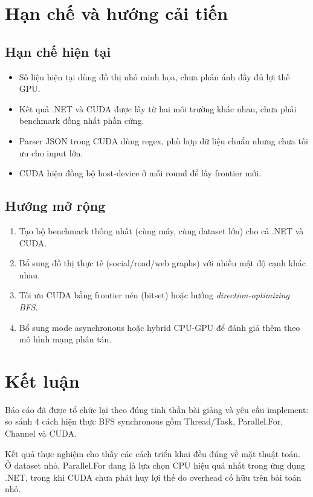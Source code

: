 \documentclass[12pt,a4paper]{article}
\begin{document}
\section{Hạn chế và hướng cải tiến}

\subsection{Hạn chế hiện tại}
\begin{itemize}
    \item Số liệu hiện tại dùng đồ thị nhỏ minh họa, chưa phản ánh đầy đủ lợi thế GPU.
    \item Kết quả .NET và CUDA được lấy từ hai môi trường khác nhau, chưa phải benchmark đồng nhất phần cứng.
    \item Parser JSON trong CUDA dùng regex, phù hợp dữ liệu chuẩn nhưng chưa tối ưu cho input lớn.
    \item CUDA hiện đồng bộ host-device ở mỗi round để lấy frontier mới.
\end{itemize}

\subsection{Hướng mở rộng}
\begin{enumerate}
    \item Tạo bộ benchmark thống nhất (cùng máy, cùng dataset lớn) cho cả .NET và CUDA.
    \item Bổ sung đồ thị thực tế (social/road/web graphs) với nhiều mật độ cạnh khác nhau.
    \item Tối ưu CUDA bằng frontier nén (bitset) hoặc hướng \textit{direction-optimizing BFS}.
    \item Bổ sung mode asynchronous hoặc hybrid CPU-GPU để đánh giá thêm theo mô hình mạng phân tán.
\end{enumerate}

\section{Kết luận}
Báo cáo đã được tổ chức lại theo đúng tinh thần bài giảng và yêu cầu implement:
so sánh 4 cách hiện thực BFS synchronous gồm Thread/Task, Parallel.For, Channel và CUDA.

Kết quả thực nghiệm cho thấy các cách triển khai đều đúng về mặt thuật toán.
Ở dataset nhỏ, Parallel.For đang là lựa chọn CPU hiệu quả nhất trong ứng dụng .NET,
trong khi CUDA chưa phát huy lợi thế do overhead cố hữu trên bài toán nhỏ.
\end{document}
